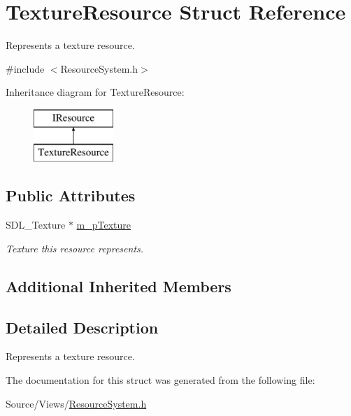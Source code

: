 \hypertarget{struct_texture_resource}{}\section{Texture\+Resource Struct Reference}
\label{struct_texture_resource}


Represents a texture resource.  




{\ttfamily \#include $<$Resource\+System.\+h$>$}

Inheritance diagram for Texture\+Resource\+:\begin{figure}[H]
\begin{center}
\leavevmode
\includegraphics[height=2.000000cm]{struct_texture_resource}
\end{center}
\end{figure}
\subsection*{Public Attributes}
\begin{DoxyCompactItemize}
\item 
\mbox{\label{struct_texture_resource_a50412396bd47d075ee020737fa4a9cf2}} 
S\+D\+L\+\_\+\+Texture $\ast$ \mbox{\hyperlink{struct_texture_resource_a50412396bd47d075ee020737fa4a9cf2}{m\+\_\+p\+Texture}}
\begin{DoxyCompactList}\small\item\em Texture this resource represents. \end{DoxyCompactList}\end{DoxyCompactItemize}
\subsection*{Additional Inherited Members}


\subsection{Detailed Description}
Represents a texture resource. 

The documentation for this struct was generated from the following file\+:\begin{DoxyCompactItemize}
\item 
Source/\+Views/\mbox{\hyperlink{_resource_system_8h}{Resource\+System.\+h}}\end{DoxyCompactItemize}
